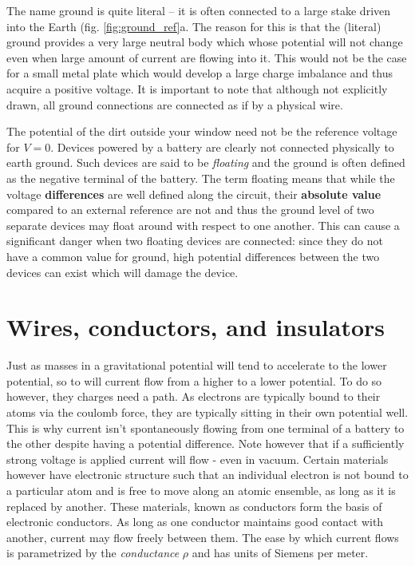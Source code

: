 \documentclass{tufte-book}
\begin{document}
The name ground is quite literal -- it is often connected to a large stake driven into the Earth (fig. \ref{fig:ground_ref}a. The reason for this is that the (literal) ground provides a very large neutral body which whose potential will not change even when large amount of current are flowing into it. This would not be the case for a small metal plate which would develop a large charge imbalance and thus acquire a positive voltage. It is important to note that although not explicitly drawn, all ground connections are connected as if by a physical wire. 

The potential of the dirt outside your window need not be the reference voltage for $V=0$. Devices powered by a battery are clearly not connected physically to earth ground. Such devices are said to be \textit{floating} and the ground is often defined as the negative terminal of the battery. The term floating means that while the voltage \textbf{differences} are well defined along the circuit, their \textbf{absolute value} compared to an external reference are not and thus the ground level of two separate devices may float around with respect to one another. This can cause a significant danger when two floating devices are connected: since they do not have a common value for ground, high potential differences between the two devices can exist which will damage the device. 

\section{Wires, conductors, and insulators}
Just as masses in a gravitational potential will tend to accelerate to the lower potential, so to will current flow from a higher to a lower potential. To do so however, they charges need a path. As electrons are typically bound to their atoms via the coulomb force, they are typically sitting in their own potential well. This is why current isn't spontaneously flowing from one terminal of a battery to the other despite having a potential difference. Note however that if a sufficiently strong voltage is applied current will flow - even in vacuum. Certain materials however have electronic structure such that an individual electron is not bound to a particular atom and is free to move along an atomic ensemble, as long as it is replaced by another. These materials, known as conductors form the basis of electronic conductors. As long as one conductor maintains good contact with another, current may flow freely between them. The ease by which current flows is parametrized by the \textit{conductance} $\rho$ and has units of Siemens per meter.
\end{document}

